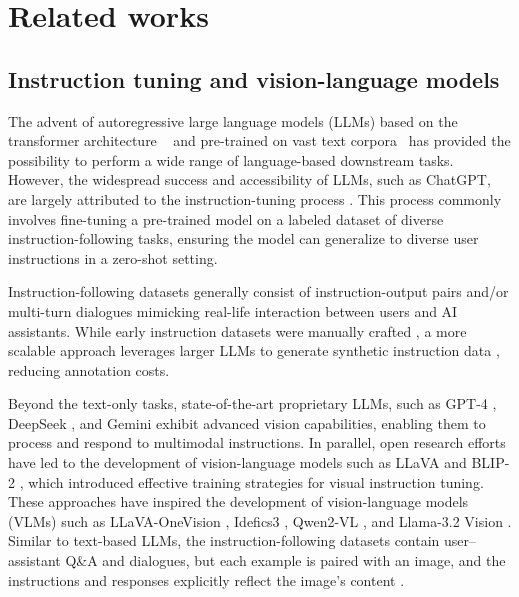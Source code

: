 \section{Related works}
\subsection{Instruction tuning and vision-language models}

The advent of autoregressive large language models (LLMs) based on the transformer architecture ~\citep{vaswani2017attention} and pre-trained on vast text corpora~\citep{radford2019language, brown2020language} has provided the possibility to perform a wide range of language-based downstream tasks. However, the widespread success and accessibility of LLMs, such as ChatGPT, are largely attributed to the instruction-tuning process \citep{wei2021finetuned, ouyang2022training}. This process commonly involves fine-tuning a pre-trained model on a labeled dataset of diverse instruction-following tasks, ensuring the model can generalize to diverse user instructions in a zero-shot setting. 

Instruction-following datasets generally consist of instruction-output pairs and/or multi-turn dialogues \citep{zheng2023lmsys} mimicking real-life interaction between users and AI assistants. While early instruction datasets were manually crafted \citep{wei2021finetuned}, a more scalable approach leverages larger LLMs to generate synthetic instruction data \citep{wang2022self, peng2023instruction, liu2023visual}, reducing annotation costs. 

Beyond the text-only tasks, state-of-the-art proprietary LLMs, such as GPT-4 \citep{achiam2023gpt}, DeepSeek \citep{liu2024deepseek, guo2025deepseek}, and Gemini \citep{team2023gemini} exhibit advanced vision capabilities, enabling them to process and respond to multimodal instructions. In parallel, open research efforts have led to the development of vision-language models such as LLaVA \citep{liu2023visual} and BLIP-2 \citep{li2023blip}, which introduced effective training strategies for visual instruction tuning. These approaches have inspired the development of vision-language models (VLMs) such as LLaVA-OneVision \citep{li2024llava}, Idefics3 \citep{laurencon2024building}, Qwen2-VL \citep{wang2024qwen2vl}, and Llama-3.2 Vision \citep{dubey2024llama}. Similar to text-based LLMs, the instruction-following datasets contain user–assistant Q\&A and dialogues, but each example is paired with an image, and the instructions and responses explicitly reflect the image's content \citep{feng2022mmdialog}. 


